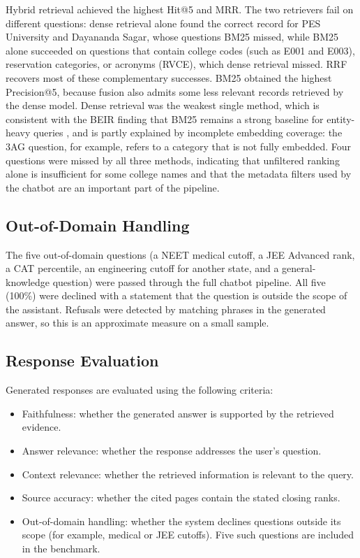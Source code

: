 \documentclass[conference]{IEEEtran}
\begin{document}
Hybrid retrieval achieved the highest Hit@5 and MRR. The two
retrievers fail on different questions: dense retrieval alone found
the correct record for PES University and Dayananda Sagar, whose
questions BM25 missed, while BM25 alone succeeded on questions that
contain college codes (such as E001 and E003), reservation categories,
or acronyms (RVCE), which dense retrieval missed. RRF recovers most of
these complementary successes. BM25 obtained the highest
Precision@5, because fusion also admits some less relevant records
retrieved by the dense model. Dense retrieval was the weakest single
method, which is consistent with the BEIR finding that BM25 remains a
strong baseline for entity-heavy queries \cite{BEIR2021}, and is
partly explained by incomplete embedding coverage: the 3AG question,
for example, refers to a category that is not fully embedded. Four
questions were missed by all three methods, indicating that unfiltered
ranking alone is insufficient for some college names and that the
metadata filters used by the chatbot are an important part of the
pipeline.

\subsection{Out-of-Domain Handling}

The five out-of-domain questions (a NEET medical cutoff, a JEE
Advanced rank, a CAT percentile, an engineering cutoff for another
state, and a general-knowledge question) were passed through the full
chatbot pipeline. All five (100\%) were declined with a statement that
the question is outside the scope of the assistant. Refusals were
detected by matching phrases in the generated answer, so this is an
approximate measure on a small sample.

\subsection{Response Evaluation}

Generated responses are evaluated using the following criteria:

\begin{itemize}
    \item Faithfulness: whether the generated
    answer is supported by the retrieved evidence.

    \item Answer relevance: whether the response
    addresses the user's question.

    \item Context relevance: whether the retrieved
    information is relevant to the query.

    \item Source accuracy: whether the cited
    pages contain the stated closing ranks.

    \item Out-of-domain handling: whether the system declines
    questions outside its scope (for example, medical or JEE
    cutoffs). Five such questions are included in the benchmark.
\end{itemize}
\end{document}
